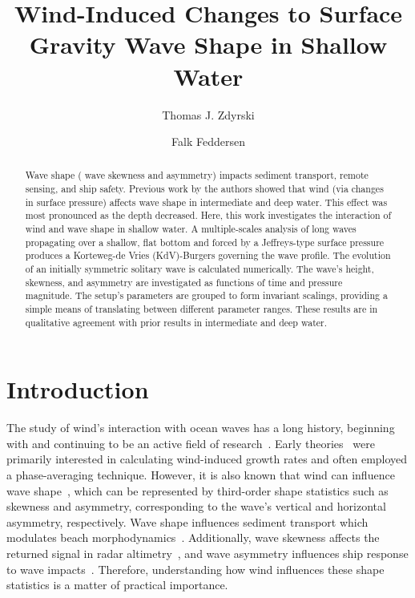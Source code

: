 \documentclass{jfm}
\title{Wind-Induced Changes to Surface Gravity Wave Shape in Shallow Water}
\author{Thomas J. Zdyrski \and Falk Feddersen}
\begin{document}
\maketitle

\begin{abstract}
Wave shape (\eg{} wave skewness and asymmetry) impacts sediment
transport, remote sensing, and ship safety.
Previous work by the authors showed that wind (via changes in surface
pressure) affects wave shape in intermediate and deep water.
This effect was most pronounced as the depth decreased.
Here, this work investigates the interaction of wind and wave shape in
shallow water.
A multiple-scales analysis of long waves propagating over a shallow,
flat bottom and forced by a Jeffreys-type surface pressure produces a
Korteweg-de Vries (KdV)-Burgers governing the wave profile.
The evolution of an initially symmetric solitary wave is calculated
numerically.
The wave's height, skewness, and asymmetry are investigated as functions
of time and pressure magnitude.
The setup's parameters are grouped to form invariant scalings,
providing a simple means of translating between different parameter
ranges.
These results are in qualitative agreement with prior results in
intermediate and deep water.
\end{abstract}

\section{Introduction}

The study of wind's interaction with ocean waves has a long history, beginning
with \citet{jeffreys1925formation} and continuing to be an active field
of
research~\citep[\eg][]{janssen1991quasi,donelan2004limiting,sulivan2010dynamics}.
Early
theories~\citep[\eg][]{jeffreys1925formation,miles1957generation,phillips1957generation}
were primarily interested in calculating wind-induced growth rates
and often employed a phase-averaging technique.
However, it is also known that wind can influence wave
shape~\citep[\eg][]{leykin1995asymmetry,feddersen2005wind,zdyrski2020wind},
which can be represented by third-order shape statistics such as
skewness and asymmetry, corresponding to the wave's vertical and
horizontal asymmetry, respectively.
Wave shape influences sediment transport
\citep[\eg][]{drake2001discrete, gonzalez2007seabed} which modulates
beach morphodynamics~\citep[\eg][]{hoefel2003wave}.
Additionally, wave skewness affects the returned signal in radar
altimetry~\citep[\eg][]{hayne1980radar,huang1983non},
and wave asymmetry influences ship response to wave
impacts~\citep[\eg][]{soares2008abnormal,oberhagemann2013prediction}.
Therefore, understanding how wind influences these shape statistics is a
matter of practical importance.
\end{document}
